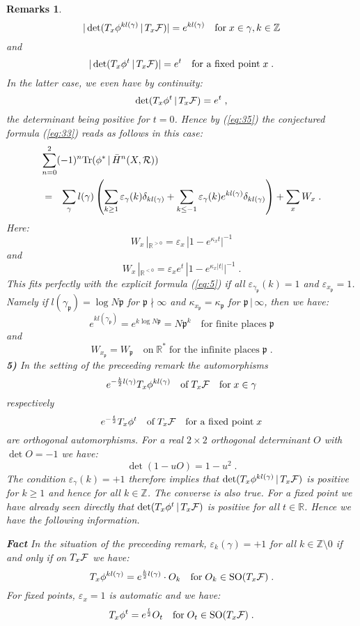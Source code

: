 \documentclass[11pt,leqno]{article}
\newcommand{\SO}{\mathrm{SO}}
\newcommand{\R}{{\mathbb{R}}}
\newcommand{\Z}{{\mathbb{Z}}}
\newcommand{\Tr}{\mathrm{Tr}}
\newcommand{\Fh}{{\cal F}}
\newcommand{\Rh}{{\cal R}}
\newcommand{\ep}{\mathfrak{p}}
\newcommand{\oH}{\bar{H}}
\newcommand{\ohne}{\setminus}
\newcommand{\tei}{\, | \,}
\newtheorem{remarks}[theorem]{Remarks}
\begin{document}
\begin{remarks}
\[
|\det (T_x \phi^{kl (\gamma)} \tei T_x \Fh)| = e^{kl (\gamma)} \quad \mbox{for} \; x \in \gamma , k \in \Z
\]
and
\[
|\det (T_x \phi^t \tei T_x \Fh)| = e^t \quad \mbox{for a fixed point} \; x \; .
\]
In the latter case, we even have by continuity:
\[
\det (T_x \phi^t \tei T_x \Fh) = e^t \; ,
\]
the determinant being positive for $t = 0$. Hence by (\ref{eq:35}) the conjectured formula (\ref{eq:33}) reads as follows in this case:
\begin{eqnarray}
  \label{eq:36}
  \lefteqn{\sum^2_{n=0} (-1)^n \Tr (\phi^* \tei \oH^n (X, \Rh))} \\
& = & \sum_{\gamma} l (\gamma) \left( \sum_{k \ge 1} \varepsilon_{\gamma} (k) \delta_{kl (\gamma)} + \sum_{k \le -1} \varepsilon_{\gamma} (k) e^{kl (\gamma)} \delta_{kl (\gamma)} \right) + \sum_x W_x \; . \nonumber
\end{eqnarray}
Here:
\[
W_x \, |_{\R^{> 0}} = \varepsilon_x \, |1 - e^{\kappa_x t}|^{-1}
\]
and
\[
W_x \, |_{\R^{< 0}} = \varepsilon_x e^t \, |1 - e^{\kappa_x |t|}|^{-1} \; .
\]
This fits perfectly with the explicit formula (\ref{eq:5}) if all $\varepsilon_{\gamma_{\ep}} (k) = 1$ and $\varepsilon_{x_{\ep}} = 1$. Namely if $l (\gamma_{\ep}) = \log N \ep$ for $\ep \nmid \infty$ and $\kappa_{x_{\ep}} = \kappa_{\ep}$ for $\ep \tei \infty$, then we have:
\[
e^{kl (\gamma_{\ep})} = e^{k \log N\ep} = N \ep^k \quad \mbox{for finite places} \; \ep
\]
and
\[
W_{x_{\ep}} = W_{\ep} \quad \mbox{on} \; \R^* \; \mbox{for the infinite places} \; \ep \; .
\]
{\bf 5)} In the setting of the preceeding remark the automorphisms
\[
e^{-\frac{k}{2} l (\gamma)} T_x \phi^{kl (\gamma)} \quad \mbox{of} \; T_x \Fh \quad \mbox{for} \; x \in \gamma
\]
respectively
\[
e^{-\frac{t}{2}} T_x \phi^t \quad \mbox{of} \; T_x \Fh \quad \mbox{for a fixed point} \; x
\]
are orthogonal automorphisms. For a real $2 \times 2$ orthogonal determinant $O$ with $\det O = -1$ we have:
\[
\det (1 - uO) = 1 - u^2 \; .
\]
The condition $\varepsilon_{\gamma} (k) = +1$ therefore implies that $\det (T_x \phi^{kl (\gamma)} \tei T_x \Fh)$ is positive for $k \ge 1$ and hence for all $k \in \Z$. The converse is also true. For a fixed point we have already seen directly that $\det (T_x \phi^t \tei T_x \Fh)$ is positive for all $t \in \R$. Hence we have the following information. 

{\bf Fact} In the situation of the preceeding remark, $\varepsilon_k (\gamma) = +1$ for all $k \in \Z \ohne 0$ if and only if on $T_x \Fh$ we have:
\[
T_x \phi^{kl (\gamma)} = e^{\frac{k}{2} l (\gamma)} \cdot O_k \quad \mbox{for} \; O_k \in \SO (T_x \Fh) \; .
\]
For fixed points, $\varepsilon_x = 1$ is automatic and we have:
\[
T_x \phi^t = e^{\frac{t}{2}} O_t \quad \mbox{for} \; O_t \in \SO (T_x \Fh) \; .
\]


\end{remarks}
\end{document}
